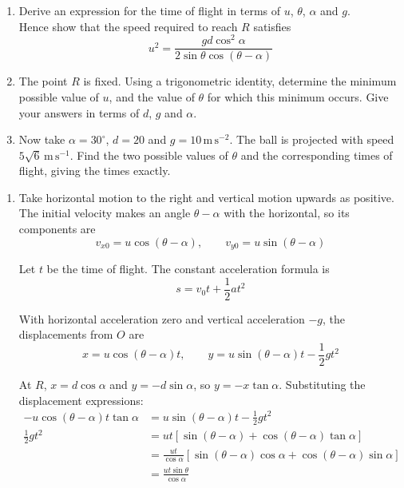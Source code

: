 \documentclass[leqno]{article}
\begin{document}
\begin{enumerate}[
  label=\textbf{\arabic*.},
  leftmargin=*,
  topsep=0pt,
  partopsep=0pt,
  parsep=0pt
]
\begin{enumerate}[label=\textbf{(\alph*)}]
\item Derive an expression for the time of flight in terms of $u$, $\theta$, $\alpha$ and $g$. \\
Hence show that the speed required to reach $R$ satisfies
\[
u^2=\frac{gd\cos^2\alpha}{2\sin\theta\cos(\theta-\alpha)}
\] 
\item The point $R$ is fixed. Using a trigonometric identity, determine the minimum possible value of $u$, and the value of $\theta$ for which this minimum occurs. Give your answers in terms of $d$, $g$ and $\alpha$.  \\
\item Now take $\alpha=30^\circ$, $d=20$ and $g=10\,\mathrm{m\,s^{-2}}$. The ball is projected with speed $5\sqrt{6}\,\mathrm{m\,s^{-1}}$. Find the two possible values of $\theta$ and the corresponding times of flight, giving the times exactly.  \\
\end{enumerate}

\vspace*{10pt}

\begin{djsSolution}
\begin{enumerate}[label=\textbf{(\alph*)}, start=1]
\item
Take horizontal motion to the right and vertical motion upwards as positive. The initial velocity makes an angle \(\theta-\alpha\) with the horizontal, so its components are
\[
v_{x0}=u\cos(\theta-\alpha),\qquad v_{y0}=u\sin(\theta-\alpha)
\]

Let \(t\) be the time of flight. The constant acceleration formula is
\[
s=v_0t+\frac12at^2
\]

With horizontal acceleration zero and vertical acceleration \(-g\), the displacements from \(O\) are
\[
x=u\cos(\theta-\alpha)t,\qquad y=u\sin(\theta-\alpha)t-\frac12gt^2
\]

At \(R\), \(x=d\cos\alpha\) and \(y=-d\sin\alpha\), so \(y=-x\tan\alpha\). Substituting the displacement expressions:
\begin{align*}
-u\cos(\theta-\alpha)t\tan\alpha
&=u\sin(\theta-\alpha)t-\frac12gt^2\\
\frac12gt^2
&=ut\left[\sin(\theta-\alpha)+\cos(\theta-\alpha)\tan\alpha\right]\\
&=\frac{ut}{\cos\alpha}\left[\sin(\theta-\alpha)\cos\alpha+\cos(\theta-\alpha)\sin\alpha\right]\\
&=\frac{ut\sin\theta}{\cos\alpha}
\end{align*}


\end{enumerate}
\end{djsSolution}
\end{enumerate}
\end{document}
